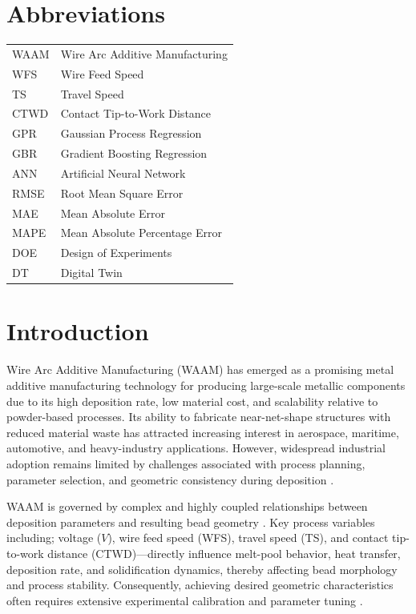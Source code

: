 \documentclass[11pt]{article}
\begin{document}
\section*{Abbreviations}

\begin{tabular}{ll}
WAAM & Wire Arc Additive Manufacturing \\
WFS & Wire Feed Speed \\
TS & Travel Speed \\
CTWD & Contact Tip-to-Work Distance \\
GPR & Gaussian Process Regression \\
GBR & Gradient Boosting Regression \\
ANN & Artificial Neural Network \\
RMSE & Root Mean Square Error \\
MAE & Mean Absolute Error \\
MAPE & Mean Absolute Percentage Error \\
DOE & Design of Experiments \\
DT & Digital Twin \\
\end{tabular}

\section{Introduction}

Wire Arc Additive Manufacturing (WAAM) has emerged as a promising metal additive manufacturing technology for producing large-scale metallic components due to its high deposition rate, low material cost, and scalability relative to powder-based processes. Its ability to fabricate near-net-shape structures with reduced material waste has attracted increasing interest in aerospace, maritime, automotive, and heavy-industry applications. However, widespread industrial adoption remains limited by challenges associated with process planning, parameter selection, and geometric consistency during deposition \cite{Lewandowski2016Review,salinas2023blockchain,DebRoy2018}.

WAAM is governed by complex and highly coupled relationships between deposition parameters and resulting bead geometry \cite{Ramasamy2026OpenSourceWAAM}. Key process variables including; voltage ($V$), wire feed speed (WFS), travel speed (TS), and contact tip-to-work distance (CTWD)—directly influence melt-pool behavior, heat transfer, deposition rate, and solidification dynamics, thereby affecting bead morphology and process stability. Consequently, achieving desired geometric characteristics often requires extensive experimental calibration and parameter tuning \cite{Williams2016,Karmuhilan2018,Wu2018,Xiong2014}.
\end{document}
